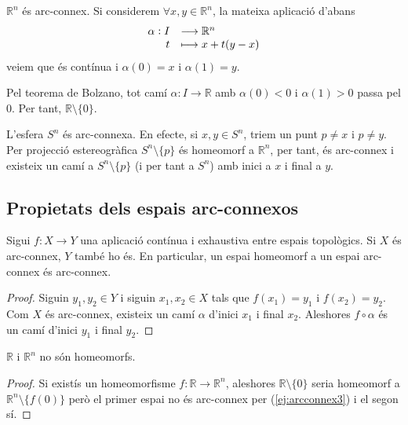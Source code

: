 \documentclass[../main.tex]{subfiles}
\begin{document}
\begin{ej}
\label{ej:arcconnex2} $\mathbb{R}^n$ és arc-connex. Si considerem $\forall x,y\in\mathbb{R}^n$, la mateixa aplicació d'abans
\begin{equation}
    \notag
    \begin{array}{rl}
        \alpha:I & \longrightarrow\mathbb{R}^n \\
        t & \longmapsto x+t(y-x)
    \end{array}
\end{equation}
veiem que és contínua i $\alpha(0) = x$ i $\alpha(1) = y$.
\end{ej}

\begin{ej}
\label{ej:arcconnex3} Pel teorema de Bolzano, tot camí $\alpha:I\rightarrow\mathbb{R}$ amb $\alpha(0)<0$ i $\alpha(1)>0$ passa pel 0. Per tant, $\mathbb{R}\setminus\{0\}$.
\end{ej}

\begin{ej}
\label{ej:arcconnex4} L'esfera $S^n$ és arc-connexa. En efecte, si $x,y\in S^n$, triem un punt $p\not=x$ i $p\not=y$. Per projecció estereogràfica $S^n\setminus\{p\}$ és homeomorf a $\mathbb{R}^n$, per tant, és arc-connex i existeix un camí a $S^n\setminus\{p\}$ (i per tant a $S^n$) amb inici a $x$ i final a $y$.
\end{ej}

\subsection{Propietats dels espais arc-connexos}

\begin{prop}
\label{prop:arcconnex1} Sigui $f:X\rightarrow Y$ una aplicació contínua i exhaustiva entre espais topològics. Si $X$ és arc-connex, $Y$ també ho és. En particular, un espai homeomorf a un espai arc-connex és arc-connex.
\end{prop}
\begin{proof}
Siguin $y_1,y_2\in Y$ i siguin $x_1,x_2\in X$ tals que $f(x_1) = y_1$ i $f(x_2) = y_2$. Com $X$ és arc-connex, existeix un camí $\alpha$ d'inici $x_1$ i final $x_2$. Aleshores $f\circ \alpha$ és un camí d'inici $y_1$ i final $y_2$.
\end{proof}

\begin{coro}
\label{coro:rirnnosonhomeomorfs} $\mathbb{R}$ i $\mathbb{R}^n$ no són homeomorfs.
\end{coro}
\begin{proof}
Si existís un homeomorfisme $f:\mathbb{R}\longrightarrow \mathbb{R}^n$, aleshores $\mathbb{R}\setminus\{0\}$ seria homeomorf a $\mathbb{R}^n\setminus\{f(0)\}$ però el primer espai no és arc-connex per (\ref{ej:arcconnex3}) i el segon sí.
\end{proof}
\end{document}
